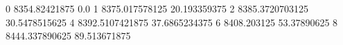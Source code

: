 0 8354.82421875 0.0
1 8375.017578125 20.193359375
2 8385.3720703125 30.5478515625
4 8392.5107421875 37.6865234375
6 8408.203125 53.37890625
8 8444.337890625 89.513671875
